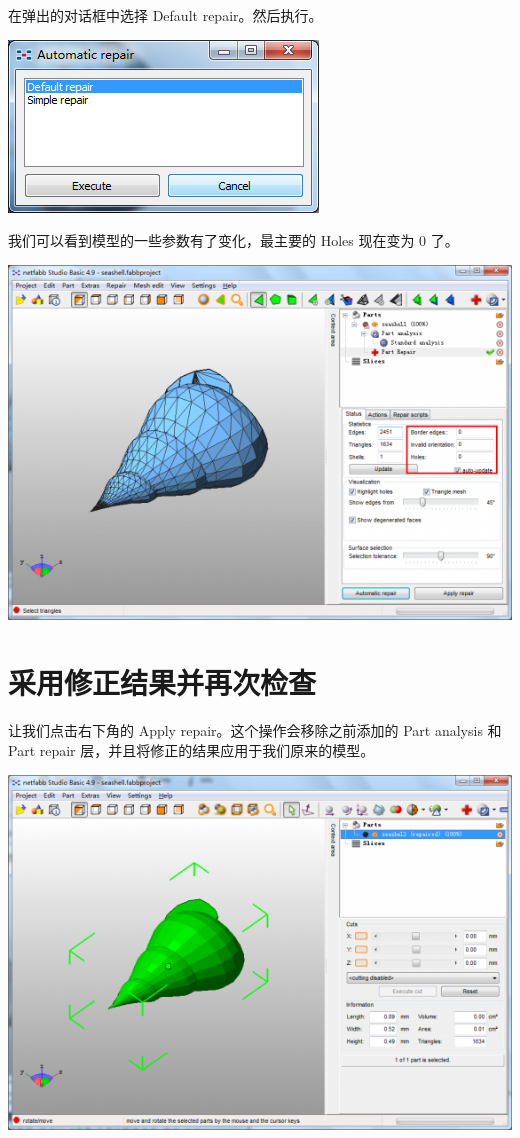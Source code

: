\documentclass[10pt,a4paper]{article}
\begin{document}
\begin{CJK*}{UTF8}{song}
在弹出的对话框中选择 Default repair。然后执行。

\includegraphics[width=0.7\linewidth]{defaultRepair}

我们可以看到模型的一些参数有了变化，最主要的 Holes 现在变为 0 了。

\includegraphics[width=0.7\linewidth]{noHoles}

\section{采用修正结果并再次检查}
让我们点击右下角的 Apply repair。这个操作会移除之前添加的 Part analysis 和 Part repair 层，并且将修正的结果应用于我们原来的模型。

\includegraphics[width=0.7\linewidth]{repairResult}


\end{CJK*}
\end{document}
